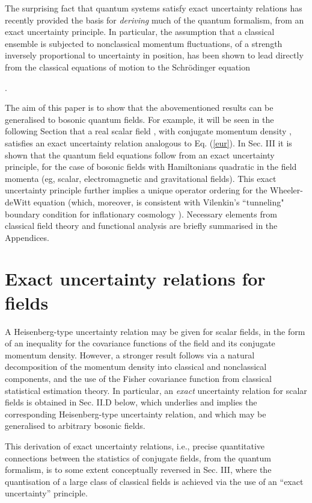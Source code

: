 \documentclass[a4paper,preprint, showpacs, aps, draft]{revtex4}
\begin{document}
The surprising fact that quantum systems satisfy exact uncertainty
relations has recently provided the basis for {\it deriving} much of the quantum
formalism, from an exact uncertainty principle.  In particular, the
assumption that a classical ensemble is subjected to nonclassical momentum
fluctuations, of a strength inversely proportional to uncertainty in
position, has been shown to lead directly from the classical equations
of motion to the Schr\"{o}dinger equation {\cite{hallreg, bamberg}. 

The aim of this paper is to show that the abovementioned results
can be generalised to bosonic quantum fields.  For
example, it will be seen in the following Section 
that a real scalar field \coordHE{}, with conjugate
momentum density \coordHE{}, satisfies an exact uncertainty relation 
analogous to Eq. (\ref{eur}).  In Sec. III 
it is shown that the
quantum field equations follow from an exact uncertainty principle, for
the case of bosonic fields with Hamiltonians quadratic in the field
momenta (eg, scalar, electromagnetic and gravitational fields).  This
exact uncertainty principle further implies a unique operator ordering
for the Wheeler-deWitt equation (which, moreover, is consistent with
Vilenkin's ``tunneling" boundary condition for inflationary cosmology
\cite {vilenkin}).  Necessary elements from
classical field theory and functional analysis are briefly summarised in
the Appendices.
 
\section{Exact uncertainty relations for fields}

A Heisenberg-type uncertainty relation  may be given 
for scalar fields, in the form of
an inequality for the covariance functions of the
field and its conjugate momentum density.  However, a stronger result
follows via a natural
decomposition of the momentum density into classical and nonclassical
components, and the use of the Fisher covariance function from classical
statistical estimation theory.  In particular,
an {\it exact} uncertainty relation for scalar fields is obtained in
Sec. II.D below, which underlies and implies the corresponding Heisenberg-type
uncertainty relation, and which may be generalised to arbitrary bosonic
fields. 

This derivation of exact uncertainty relations,
i.e., precise quantitative connections between the statistics of
conjugate fields, from the quantum formalism, is to some extent
conceptually reversed in Sec. III, where the quantisation of a large
class of classical fields is achieved via the use of an ``exact
uncertainty'' principle. 

}
\end{document}
